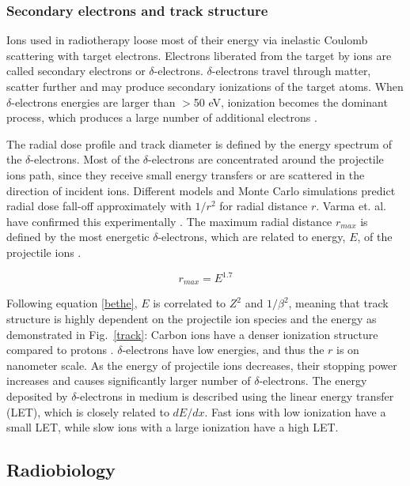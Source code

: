 \documentclass[type=dr, dr=rernat, accentcolor=tud7b,colorbacktitle, bigchapter, openright, twoside, 12pt ]{tudthesis}
\begin{document}
\subsubsection{Secondary electrons and track structure}

Ions used in radiotherapy loose most of their energy via inelastic Coulomb scattering with target electrons. Electrons liberated from the target by ions are called secondary electrons or $\delta$-electrons. 
$\delta$-electrons travel through matter, scatter further and may produce secondary ionizations of the target atoms. When $\delta$-electrons energies are larger than $>$50 eV,
ionization becomes the dominant process, which produces a large number of additional electrons \cite{Kraft2000,Schardt2010}.

The radial dose profile and track diameter is defined by the energy spectrum of the $\delta$-electrons. Most of the $\delta$-electrons are concentrated around the projectile ions path, since they receive small energy transfers 
or are scattered in the direction of incident ions. Different models \cite{Chatterjee1976,Katz1999} and Monte Carlo simulations \cite{Paretzke1986,Kraemer1995} predict radial dose fall-off approximately with $1/r^2$ for radial distance $r$. Varma et. al. have confirmed 
this experimentally \cite{Varma1977}. The maximum radial distance $r_{max}$ is defined by the most energetic $\delta$-electrons, which are related to energy, $E$, of the projectile ions \cite{Kiefer1986}.

\begin{equation}
 r_{max} = E^{1.7}
\end{equation}

Following equation \ref{bethe}, $E$ is correlated to $Z^2$ and $1/\beta^2$, meaning that track structure is highly dependent on the projectile ion species and the energy as demonstrated in Fig.~\ref{track}:
Carbon ions have a denser ionization structure compared to protons \cite{Kraemer2010}. $\delta$-electrons have low energies, and thus the $r$ is on nanometer scale. As the energy of projectile ions decreases, their
stopping power increases and causes significantly larger number of $\delta$-electrons. The energy deposited by $\delta$-electrons in medium is described using the linear energy transfer (LET), which is closely related to 
$dE/dx$. Fast ions with low ionization have a small LET, while slow ions with a large ionization have a high LET.


\subsection{Radiobiology}
\end{document}
